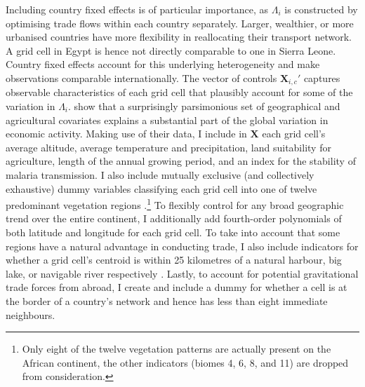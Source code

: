 \documentclass[11pt, oneside]{article}   	%
\begin{document}
Including country fixed effects is of particular importance, as $\Lambda_{i}$ is constructed by optimising trade flows within each country separately. Larger, wealthier, or more urbanised countries have more flexibility in reallocating their transport network. A grid cell in Egypt is hence not directly comparable to one in Sierra Leone.  Country fixed effects account for this underlying heterogeneity and make observations comparable internationally. The vector of controls $\textbf{X}_{i,c}'$ captures observable characteristics of each grid cell that plausibly account for some of the variation in $\Lambda_{i}$. \cite{Henderson_GlobalSpatialDistribution_2018} show that a surprisingly parsimonious set of geographical and agricultural covariates explains a substantial part of the global variation in economic activity. Making use of their data, I include in $\textbf{X}$ each grid cell's average altitude, average temperature and precipitation, land suitability for agriculture, length of the annual growing period, and an index for the stability of malaria transmission. I also include mutually exclusive (and collectively exhaustive) dummy variables classifying each grid cell into one of twelve predominant vegetation regions \citep[or \emph{biomes}, see][]{Henderson_GlobalSpatialDistribution_2018}.\footnote{Only eight of the twelve vegetation patterns are actually present on the African continent, the other indicators (biomes 4, 6, 8, and 11) are dropped from consideration.} To flexibly control for any broad geographic trend over the entire continent, I additionally add fourth-order polynomials of both latitude and longitude for each grid cell. To take into account that some regions have a natural advantage in conducting trade, I also include indicators for whether a grid cell's centroid is within 25 kilometres of a natural harbour, big lake, or navigable river respectively \citep[again using data from][]{Henderson_GlobalSpatialDistribution_2018}. Lastly, to account for potential gravitational trade forces from abroad, I create and include a dummy for whether a cell is at the border of a country's network and hence has less than eight immediate neighbours.
\end{document}
